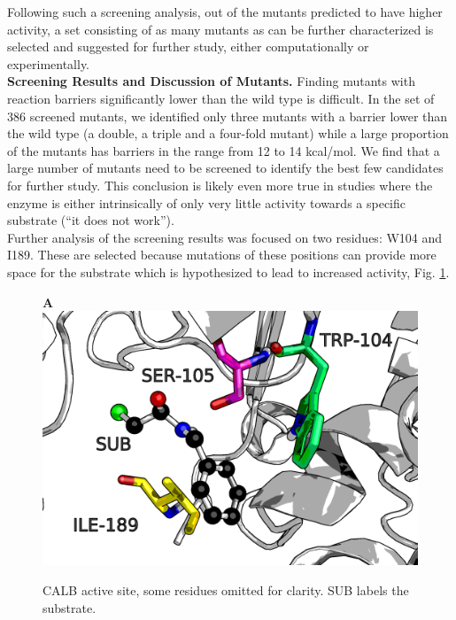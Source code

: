 Following such a screening analysis, out of the mutants predicted to have higher activity, a set consisting of as many mutants as can be further characterized is selected and suggested for further study, either computationally or experimentally.\\
\textbf{Screening Results and Discussion of Mutants.}
Finding mutants with reaction barriers significantly lower than the wild type is difficult.
In the set of 386 screened mutants, we identified only three mutants with a barrier lower than the wild type (a double, a triple and a four-fold mutant) while a large proportion of the mutants has barriers in the range from 12 to 14 kcal/mol.
We find that a large number of mutants need to be screened to identify the best few candidates for further study.
This conclusion is likely even more true in studies where the enzyme is either intrinsically of only very little activity towards a specific substrate (``it does not work'').\\
Further analysis of the screening results was focused on two residues: W104 and I189.
These are selected because mutations of these positions can provide more space for the substrate which is hypothesized to lead to increased activity, Fig. \ref{fig:calb-views}.
\begin{figure}[htbp] 
\textbf{A}
\includegraphics[width=0.95\linewidth]{calb-active-site.png}
\caption{
CALB active site, some residues omitted for clarity.
SUB labels the substrate.
}
\label{fig:calb-views}
\end{figure}
